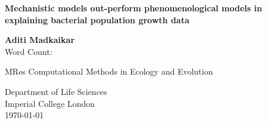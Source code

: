 \documentclass[11pt]{article}
\newcommand{\quickwordcount}[1]{%
%
}
\newcommand{\thedate}{\today}
\begin{document}
\begin{titlepage}
   \begin{center}
       \vspace*{2cm}

       \Huge
       \textbf{Mechanistic models out-perform phenomenological models in explaining bacterial population growth data}
            
       \vspace{2cm}

       \Large
       \textbf{Aditi Madkaikar} \\
       Word Count: \quickwordcount{main}

       \vfill
            
       MRes Computational Methods in Ecology and Evolution\\
            
       \vspace{0.6cm}
     
       Department of Life Sciences\\
       Imperial College London\\
       \thedate \\
            
   \end{center}
\end{titlepage} 

\newpage

\begin{abstract}
Bacterial population growth studies are used as a tool in many different fields like ecology, food science, and conservation. Obtaining a growth curve is challenging as most bacteria are unculturable in laboratory conditions and even after culturing there are many problems in quantifying and model fitting. In this project, I have tried to fit different linear and non-linear models to a bacterial population growth dataset to find out which model is the best fit for the data. The entire analysis was carried out in the form of a workflow. It can be reproduced by running the script run\_miniproject.sh. The analysis was carried out in R and the report used \LaTeX. The non-linear models used and mechanistic and have an overall better fit for the regular data subsets. At the same time, the phenomenological linear models show a better fit for the poor data subsets. Overall, the mechanistic models are a better fit for growth data than the phenomenological models. 
\end{abstract}
\end{document}
